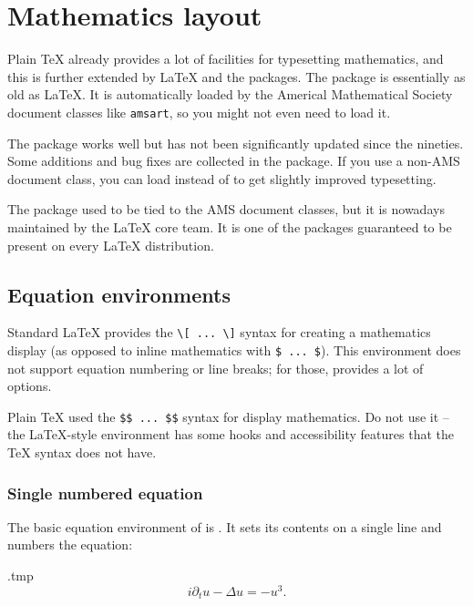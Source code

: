 \chapter{Mathematics layout}\label{sec:mathematics}

Plain \TeX{} already provides a lot of facilities for typesetting mathematics,
and this is further extended by \LaTeX{} and the  packages.
The  package is essentially as old as \LaTeX{}.
It is automatically loaded by the Americal Mathematical Society document classes like \verb|amsart|,
so you might not even need to load it.

The package works well but has not been significantly updated since the nineties.
Some additions and bug fixes are collected in the  package.
If you use a non-AMS document class, you can load  instead of 
to get slightly improved typesetting.

\begin{technote}
The  package used to be tied to the AMS document classes,
but it is nowadays maintained by the \LaTeX{} core team.
It is one of the packages guaranteed to be present on every \LaTeX{} distribution.
\end{technote}


%
%
%
\section{Equation environments}

Standard \LaTeX{} provides the \verb|\[ ... \]| syntax for
creating a mathematics display (as opposed to inline mathematics with \verb|$ ... $|).
This environment does not support equation numbering or line breaks;
for those,  provides a lot of options.

\begin{warning}
Plain \TeX{} used the \verb|$$ ... $$| syntax for display mathematics.
Do not use it -- the \LaTeX-style environment has some hooks and accessibility features
that the \TeX{} syntax does not have.
\end{warning}


%
%
\subsection{Single numbered equation}

The basic equation environment of  is .
It sets its contents on a single line and numbers the equation:
%
\begin{VerbatimOut}{\jobname.tmp}
\begin{equation}
i \partial_t u - \Delta u = -u^3.
\end{equation}
\end{VerbatimOut}
\ShowExample

